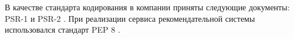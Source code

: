 В качестве стандарта кодирования в компании приняты следующие документы: PSR-1 \cite{PSR1}
и PSR-2 \cite{PSR2}. При реализации сервиса рекомендательной системы использовался
стандарт PEP 8 \cite{PEP8}.
